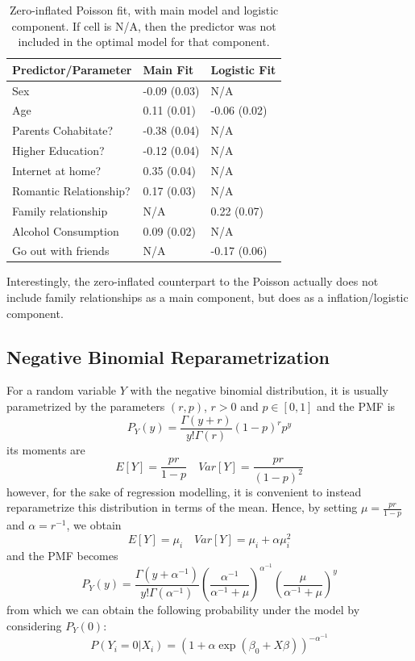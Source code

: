 \documentclass[12pt, titlepage]{article}
\begin{document}
	\begin{table}[h!]
		\centering
		\begin{tabular}{|l|l|l|}
			\hline
			Predictor/Parameter & Main Fit & Logistic Fit  \\
			\hline 
			Sex & -0.09 (0.03) & N/A \\
			Age & 0.11 (0.01) & -0.06 (0.02)  \\
			Parents Cohabitate? & -0.38 (0.04) & N/A \\
			Higher Education? & -0.12 (0.04) & N/A  \\
			Internet at home?& 0.35 (0.04) & N/A \\
			Romantic Relationship?& 0.17 (0.03) & N/A  \\
			Family relationship & N/A & 0.22 (0.07) \\ 
			Alcohol Consumption & 0.09 (0.02) & N/A \\
			Go out with friends & N/A & -0.17 (0.06)\\
			\hline
		\end{tabular}
		\caption{Zero-inflated Poisson fit, with main model and logistic component. If cell is N/A, then the predictor was not included in the optimal model for that component.}
	\end{table}

	Interestingly, the zero-inflated counterpart to the Poisson actually does not include family relationships as a main component, but does as a inflation/logistic component.
	
	\subsection*{Negative Binomial Reparametrization}
	For a random variable $Y$ with the negative binomial distribution, it is usually parametrized by the parameters $(r,p)$, $r>0$ and $p\in[0,1]$ and the PMF is
	$$
	P_Y(y) = \frac{\Gamma(y+r)}{y!\Gamma(r)}(1-p)^{r}p^{y}
	$$
	its moments are
	$$
	E[Y] = \frac{pr}{1-p} \quad Var[Y] = \frac{pr}{(1-p)^2}
	$$
	however, for the sake of regression modelling, it is convenient to instead reparametrize this distribution in terms of the mean. Hence, by setting $\mu = \frac{pr}{1-p}$ and $\alpha = r^{-1}$, we obtain
	$$
	E[Y] = \mu_i \quad Var[Y] = \mu_i + \alpha\mu_i^2
	$$
	and the PMF becomes
	$$
	P_Y(y) = \frac{\Gamma(y + \alpha^{-1})}{y!\Gamma(\alpha^{-1})}\left(\frac{\alpha^{-1}}{\alpha^{-1} + \mu} \right)^{\alpha^{-1}}\left(\frac{\mu}{\alpha^{-1} + \mu} \right)^y
	$$
	from which we can obtain the following probability under the model by considering $P_Y(0)$:
	$$
	P(Y_i = 0 | X_i) = (1 + \alpha \exp(\beta_0 + X\beta))^{-\alpha^{-1}}
	$$
\end{document}
